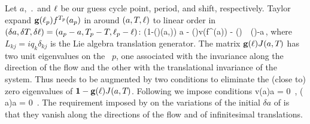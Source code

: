 Let $a$, $\period{}$ and $\ell$
be our guess cycle point, period, and shift, respectively.
Taylor expand $\mathbf{g}(\ell_p) {f^{{T_{p}}}(a_p)}$ in 
around %
$(a, {T_{}}, \ell)$ to linear order in
$(\delta a,\delta {T_{}},\delta \ell)
   =(a_p-a,{T_{p}} - {T_{}},\ell_p-\ell)$:
\beq
    \left({1}-(\shift)\jMps(a,\period{})\right) \delta a
   - (\shift)v(f^{\period{}}(a)) \delta \period{}
                            - (\shift) \delta \shift
                    \,\simeq\, (\shift)-a\,,
    \label{eq:NewtonBasicCond}
\eeq
where %
$L_{kj}=i q_k \delta_{kj}$ is the Lie algebra translation
generator. The matrix $\mathbf{g}(\ell){J}(a,{T_{}})$
has two unit eigenvalues on the \rpo\ $p$,
one associated with the invariance along
the direction of the flow and the other with the
translational invariance of the system. Thus 
needs to be augmented by two conditions to
eliminate the (close to) zero eigenvalues of
$\mathbf{1}-\mathbf{g}(\ell){J}(a,{T_{}})$. Following
 we impose 
conditions
\beq
    v(a)\cdot\delta a  =  0
    \,,\qquad
    \left( a\right)\cdot \delta a  =  0
\,.
\label{eq:NewtonAux}
\eeq
The requirement imposed by 
on the variations of the initial $\delta a$ of 
is that they   vanish along the directions of the flow
and of infinitesimal translations.

